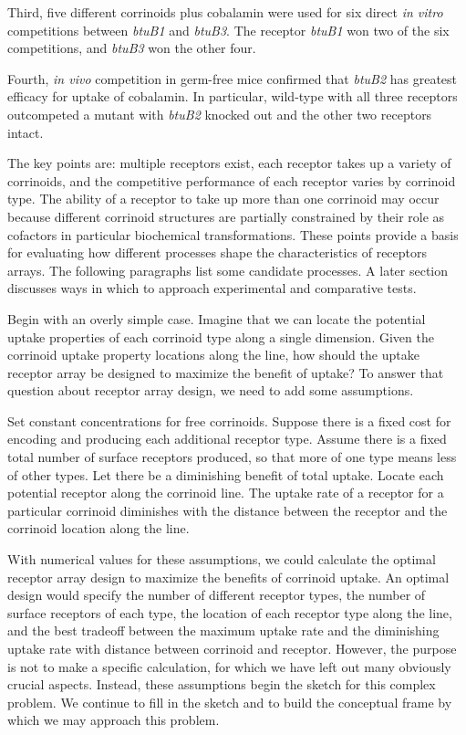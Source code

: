 \documentclass[\mydocfontsize]{article}
\begin{document}
\begin{multicols}{2}
Third, five different corrinoids plus cobalamin were used for six direct \textit{in vitro} competitions between \textit{btuB1} and \textit{btuB3}. The receptor \textit{btuB1} won two of the six competitions, and \textit{btuB3} won the other four.

Fourth, \textit{in vivo} competition in germ-free mice confirmed that \textit{btuB2} has greatest efficacy for uptake of cobalamin. In particular, wild-type with all three receptors outcompeted a mutant with \textit{btuB2} knocked out and the other two receptors intact.

The key points are: multiple receptors exist, each receptor takes up a variety of corrinoids, and the competitive performance of each receptor varies by corrinoid type. The ability of a receptor to take up more than one corrinoid may occur because different corrinoid structures are partially constrained by their role as cofactors in particular biochemical transformations.  These points provide a basis for evaluating how different processes shape the characteristics of receptors arrays. The following paragraphs list some candidate processes. A later section discusses ways in which to approach experimental and comparative tests.

 Begin with an overly simple case. Imagine that we can locate the potential uptake properties of each corrinoid type along a single dimension. Given the corrinoid uptake property locations along the line, how should the uptake receptor array be designed to maximize the benefit of uptake? To answer that question about receptor array design, we need to add some assumptions. 

Set constant concentrations for free corrinoids. Suppose there is a fixed cost for encoding and producing each additional receptor type. Assume there is a fixed total number of surface receptors produced, so that more of one type means less of other types. Let there be a diminishing benefit of total uptake. Locate each potential receptor along the corrinoid line. The uptake rate of a receptor for a particular corrinoid diminishes with the distance between the receptor and the corrinoid location along the line. 

With numerical values for these assumptions, we could calculate the optimal receptor array design to maximize the benefits of corrinoid uptake. An  optimal design would specify the number of different receptor types, the number of surface receptors of each type, the location of each receptor type along the line, and the best tradeoff between the maximum uptake rate and the diminishing uptake rate with distance between corrinoid and receptor. However, the purpose is not to make a specific calculation, for which we have left out many obviously crucial aspects. Instead, these assumptions begin the sketch for this complex problem. We continue to fill in the sketch and to build the conceptual frame by which we may approach this problem.


\end{multicols}
\end{document}
